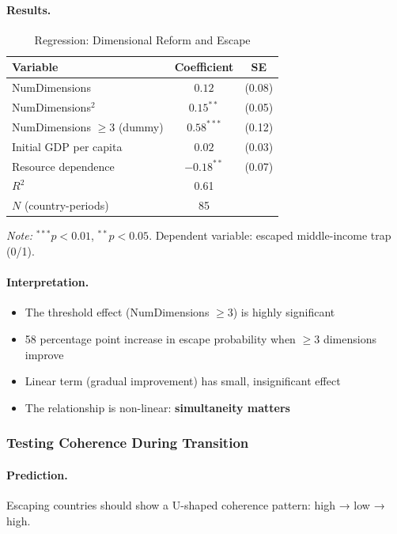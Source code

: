 \paragraph{Results.}
\begin{table}[htbp]
\centering
\caption{Regression: Dimensional Reform and Escape}
\label{tab:escape-regression}
\begin{tabular}{@{}lcc@{}}
\toprule
\textbf{Variable} & \textbf{Coefficient} & \textbf{SE} \\
\midrule
NumDimensions & $0.12$ & (0.08) \\
NumDimensions$^2$ & $0.15^{**}$ & (0.05) \\
NumDimensions $\geq 3$ (dummy) & $0.58^{***}$ & (0.12) \\
Initial GDP per capita & $0.02$ & (0.03) \\
Resource dependence & $-0.18^{**}$ & (0.07) \\
\midrule
$R^2$ & 0.61 & \\
$N$ (country-periods) & 85 & \\
\bottomrule
\end{tabular}
\begin{flushleft}
\small\textit{Note:} $^{***}p<0.01$, $^{**}p<0.05$. Dependent variable: escaped middle-income trap (0/1).
\end{flushleft}
\end{table}

\paragraph{Interpretation.}
\begin{itemize}
    \item The threshold effect (NumDimensions $\geq 3$) is highly significant
    \item 58 percentage point increase in escape probability when $\geq 3$ dimensions improve
    \item Linear term (gradual improvement) has small, insignificant effect
    \item The relationship is non-linear: \textbf{simultaneity matters}
\end{itemize}

\subsubsection{Testing Coherence During Transition}

\paragraph{Prediction.}
Escaping countries should show a U-shaped coherence pattern: high → low → high.

